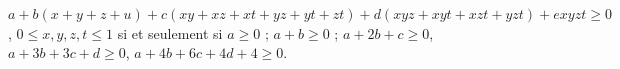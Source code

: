 $a + b(x + y + z + u) + c(xy + xz + xt + yz + yt + zt) + d(xyz + xyt + xzt + yzt) + exyzt \geq 0$, $0 \leq x, y, z, t \leq 1$ si et seulement si $a \geq 0$ ; $a + b \geq 0$ ; $a + 2b + c \geq 0$, $a + 3b + 3c + d \geq 0$, $a + 4b + 6c + 4d + 4 \geq 0$.
